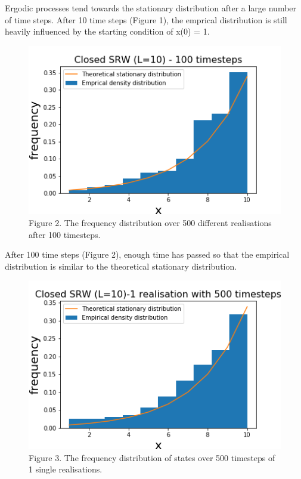 \documentclass{article}
\begin{document}
Ergodic processes tend towards the stationary distribution after a large number of time steps. After 10 time steps (Figure 1), the emprical distribution is still heavily influenced by the starting condition of x(0) = 1. 

\begin{figure}[H]
\includegraphics[scale=0.8]{100_steps_a.png} 
\small{Figure 2. The frequency distribution over 500 different realisations after 100 timesteps.}
\end{figure}

After 100 time steps (Figure 2), enough time has passed so that the empirical distribution is similar to the theoretical stationary distribution.


\begin{figure}[H]
\includegraphics[scale=0.8]{500_steps_a.png} 
\small{Figure 3. The frequency distribution of states over 500 timesteps of 1 single realisations. }
\end{figure}
\end{document}
